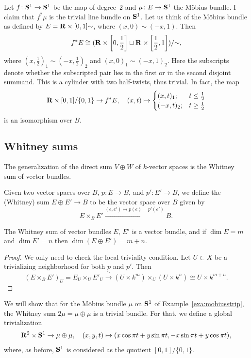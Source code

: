 \documentclass[a4paper,openany]{scrbook}
\begin{document}
\begin{example}
Let $f\colon \S^1 \to \S^1$ be the map of degree~$2$ and $\mu\colon E \to \S^1$ the Möbius bundle. I claim that $f^*\mu$ is the trivial line bundle on $\S^1$. Let us think of the Möbius bundle as defined by $E = \R \times [0,1]\mathord\sim$, where $(x,0) \sim (-x,1)$. Then
\[
f^*E \cong (\R \times \left[0,\frac12\right] \sqcup \R \times \left[\frac12,1\right])/\mathord\sim,
\]
where $(x,\frac12)_1 \sim (-x,\frac12)_2$ and $(x,0)_1 \sim (-x,1)_2$. Here the subscripts denote whether the subscripted pair lies in the first or in the second disjoint summand. This is a cylinder with two half-twists, thus trivial. In fact, the map
\[
\R \times [0,1]/\{0,1\} \to f^*E, \quad (x,t) \mapsto \begin{cases} (x,t)_1; & t \leq \frac12\\(-x,t)_2; & t \geq \frac12\end{cases}
\]
is an isomorphism over $B$.

\end{example}


\subsection{Whitney sums} \label{ssec:whitneysums}

The generalization of the direct sum $V \oplus W$ of $k$-vector spaces is the Whitney sum of vector bundles.

\begin{defn}
Given two vector spaces over $B$, $p\colon E \to B$, and $p'\colon E' \to B$, we define the (Whitney) sum $E \oplus E' \to B$ to be the vector space over $B$ given by 
\[
E \times_B E' \xrightarrow{(e,e') \mapsto p(e) = p'(e')} B.
\]
\end{defn}

\begin{lemma}
The Whitney sum of vector bundles $E$, $E'$ is a vector bundle, and if $\dim E = m$ and $\dim E' = n$ then $\dim(E\oplus E') = m+n$.
\end{lemma}

\begin{proof}
We only need to check the local triviality condition. Let $U \subset X$ be a trivializing neighborhood for both $p$ and $p'$. Then
\[
(E \times_B E')_U = E_U \times_U E'_U \xrightarrow{\cong} (U \times k^m) \times_U (U \times k^n) \cong U \times k^{m+n}.
\]
\end{proof}

\begin{example}
We will show that for the Möbius bundle $\mu$ on $\S^1$ of Example~\ref{exa:mobiusstrip}, the Whitney sum $2\mu = \mu \oplus \mu$ is a trivial bundle. For that, we define a global trivialization
\[
\R^2 \times \S^1 \to \mu \oplus \mu, \quad (x,y,t) \mapsto (x \cos \pi t + y \sin \pi t,-x \sin \pi t + y \cos \pi t),
\]
where, as before, $\S^1$ is considered as the quotient $[0,1]/\{0,1\}$.
\end{example}
\end{document}
